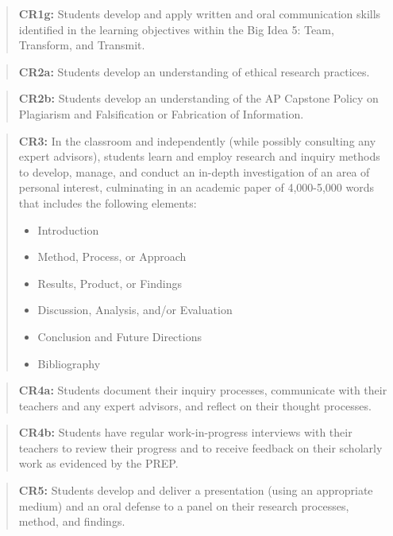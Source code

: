 \documentclass[]{article}
\providecommand{\tightlist}{%
  \setlength{\itemsep}{0pt}\setlength{\parskip}{0pt}}
\begin{document}
\begin{quote}
\textbf{CR1g:} Students develop and apply written and oral communication skills identified in the learning objectives within the Big Idea 5: Team, Transform, and Transmit.
\end{quote}

\begin{quote}
\textbf{CR2a:} Students develop an understanding of ethical research practices.
\end{quote}

\begin{quote}
\textbf{CR2b:} Students develop an understanding of the AP Capstone Policy on Plagiarism and Falsification or Fabrication of Information.
\end{quote}

\begin{quote}
\textbf{CR3:} In the classroom and independently (while possibly consulting any expert advisors), students learn and employ research and inquiry methods to develop, manage, and conduct an in-depth investigation of an area of personal interest, culminating in an academic paper of 4,000-5,000 words that includes the following elements:

\begin{itemize}
\tightlist
\item
  Introduction
\item
  Method, Process, or Approach
\item
  Results, Product, or Findings
\item
  Discussion, Analysis, and/or Evaluation
\item
  Conclusion and Future Directions
\item
  Bibliography
\end{itemize}
\end{quote}

\begin{quote}
\textbf{CR4a:} Students document their inquiry processes, communicate with their teachers and any expert advisors, and reflect on their thought processes.
\end{quote}

\begin{quote}
\textbf{CR4b:} Students have regular work-in-progress interviews with their teachers to review their progress and to receive feedback on their scholarly work as evidenced by the PREP.
\end{quote}

\begin{quote}
\textbf{CR5:} Students develop and deliver a presentation (using an appropriate medium) and an oral defense to a panel on their research processes, method, and findings.
\end{quote}
\end{document}
